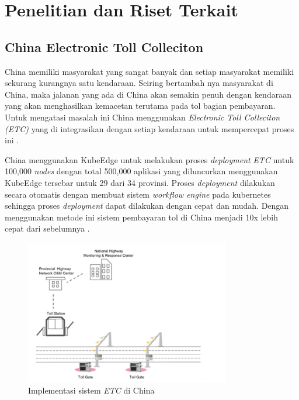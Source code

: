 \section{Penelitian dan Riset Terkait}
\label{sec:riset-terkait}

\subsection{China Electronic Toll Colleciton}
China memiliki masyarakat yang sangat banyak dan setiap masyarakat memiliki sekurang kurangnya satu kendaraan. Seiring bertambah nya masyarakat di China, maka jalanan yang ada di China akan semakin penuh dengan kendaraan yang akan menghasilkan kemacetan terutama pada tol bagian pembayaran. Untuk mengatasi masalah ini China menggunakan \textit{Electronic Toll Colleciton (ETC)} yang di integrasikan dengan setiap kendaraan untuk mempercepat proses ini \parencite{penelitianterkait1}.

China menggunakan KubeEdge untuk melakukan proses \textit{deployment} \textit{ETC} untuk 100,000 \textit{nodes} dengan total 500,000 aplikasi yang diluncurkan menggunakan KubeEdge tersebar untuk 29 dari 34 provinsi. Proses \textit{deployment} dilakukan secara otomatis dengan membuat sistem \textit{workflow engine} pada kubernetes sehingga proses \textit{deployment} dapat dilakukan dengan cepat dan mudah. Dengan menggunakan metode ini sistem pembayaran tol di China menjadi 10x lebih cepat dari sebelumnya \parencite{penelitianterkait1}.


\begin{figure}[h]
  \centering
  \includegraphics[width=0.8\textwidth]{resources/chapter-2/china-highways.jpg}
  \caption{Implementasi sistem \textit{ETC} di China \parencite{penelitianterkait1}}
  \label{fig:china-highways}
\end{figure}

